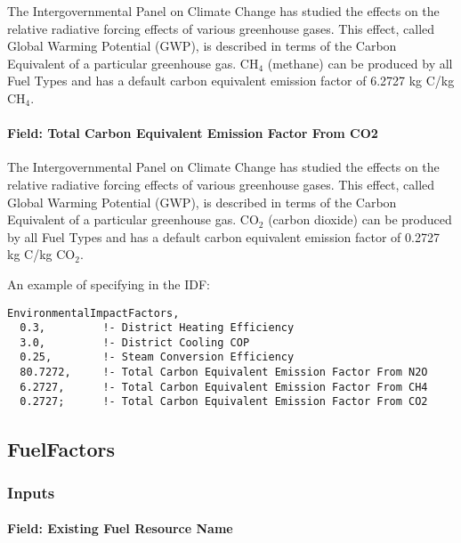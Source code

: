 The Intergovernmental Panel on Climate Change has studied the effects on the relative radiative forcing effects of various greenhouse gases. This effect, called Global Warming Potential (GWP), is described in terms of the Carbon Equivalent of a particular greenhouse gas. CH\(_{4}\) (methane) can be produced by all Fuel Types and has a default carbon equivalent emission factor of 6.2727 kg C/kg CH\(_{4}\).

\paragraph{Field: Total Carbon Equivalent Emission Factor From CO2}\label{field-total-carbon-equivalent-emission-factor-from-co2}

The Intergovernmental Panel on Climate Change has studied the effects on the relative radiative forcing effects of various greenhouse gases. This effect, called Global Warming Potential (GWP), is described in terms of the Carbon Equivalent of a particular greenhouse gas. CO\(_{2}\) (carbon dioxide) can be produced by all Fuel Types and has a default carbon equivalent emission factor of 0.2727 kg C/kg CO\(_{2}\).

An example of specifying in the IDF:

\begin{lstlisting}
EnvironmentalImpactFactors,
  0.3,         !- District Heating Efficiency
  3.0,         !- District Cooling COP
  0.25,        !- Steam Conversion Efficiency
  80.7272,     !- Total Carbon Equivalent Emission Factor From N2O
  6.2727,      !- Total Carbon Equivalent Emission Factor From CH4
  0.2727;      !- Total Carbon Equivalent Emission Factor From CO2
\end{lstlisting}

\subsection{FuelFactors}\label{fuelfactors}

\subsubsection{Inputs}\label{inputs-11-015}

\paragraph{Field: Existing Fuel Resource Name}\label{field-existing-fuel-resource-name}

